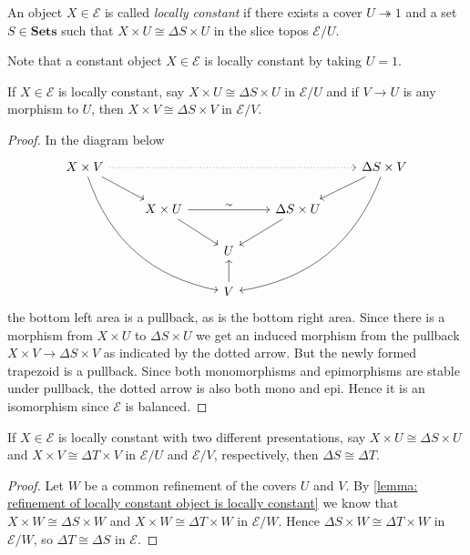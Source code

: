 \begin{definition}
An object $X \in \mathscr{E}$ is called \emph{locally constant} if there exists a cover $U \twoheadrightarrow 1$ and a set $S \in \mathbf{Sets}$ such that $X \times U \cong \Delta S \times U$ in the slice topos $\mathscr{E}/U$.
\end{definition}

Note that a constant object $X \in \mathscr{E}$ is locally constant by taking $U = 1$.

\begin{lemma}
\label{lemma: refinement of locally constant object is locally constant}
If $X \in \mathscr{E}$ is locally constant, say $X \times U \cong \Delta S \times U$ in $\mathscr{E}/U$ and if $V \to U$ is any morphism to $U$, then $X \times V \cong \Delta S \times V$ in $\mathscr{E}/V$.
\end{lemma}
\begin{proof}
In the diagram below
\[ \begin{tikzcd}
X \times V \arrow[rrrr, dotted] \arrow[dr] \arrow[dddrr, bend right] &            &   &                   & \Delta S \times V \arrow[dl] \arrow[dddll, bend left] \\
           & X \times U \arrow[rr, "\sim"] \arrow[dr] &   & \Delta S \times U \arrow[dl] & \\
           &            & U &                   & \\
           &            & V \arrow[u] &
\end{tikzcd} \]
the bottom left area is a pullback, as is the bottom right area. Since there is a morphism from $X \times U$ to $\Delta S \times U$ we get an induced morphism from the pullback $X \times V \to \Delta S \times V$ as indicated by the dotted arrow. But the newly formed trapezoid is a pullback. Since both monomorphisms and epimorphisms are stable under pullback, the dotted arrow is also both mono and epi. Hence it is an isomorphism since $\mathscr{E}$ is balanced.
\end{proof}

\begin{lemma}
\label{lemma: different presentations of locally constant object}
If $X \in \mathscr{E}$ is locally constant with two different presentations, say $X \times U \cong \Delta S \times U$ and $X \times V \cong \Delta T \times V$ in $\mathscr{E}/U$ and $\mathscr{E}/V$, respectively, then $\Delta S \cong \Delta T$.
\end{lemma}
\begin{proof}
Let $W$ be a common refinement of the covers $U$ and $V$. By \cref{lemma: refinement of locally constant object is locally constant} we know that $X \times W \cong \Delta S \times W$ and $X \times W \cong \Delta T \times W$ in $\mathscr{E}/W$. Hence $\Delta S \times W \cong \Delta T \times W$ in $\mathscr{E}/W$, so $\Delta T \cong \Delta S$ in $\mathscr{E}$.
\end{proof}

